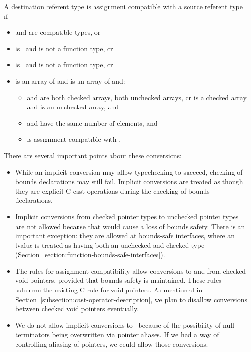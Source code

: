 A destination referent type  is assignment compatible with a source referent
type  if
\begin{itemize}
\item {} and  are compatible types, or
\item {} is \void\ and  is not a function type, or
\item {} is \void\ and  is not a function type, or
\item {} is an array of  and  is an array of 
and:
\begin{itemize}
\item {} and  are both checked arrays, both unchecked arrays, or
 is a checked array and  is an unchecked array, and
\item {} and  have the same number of elements, and
\item {} is assignment compatible with .
\end{itemize}
\end{itemize}

There are several important points about these conversions:
\begin{itemize}
\item  While an implicit conversion may allow typechecking to succeed,
       checking of bounds declarations may still fail.  Implicit
       conversions are treated as though they are explicit C cast
       operations during the checking of bounds declarations.
\item  Implicit conversions from checked pointer types to
      unchecked pointer types are not allowed because that would cause a loss of bounds safety.
      There is an important exception: they are allowed at bounds-safe interfaces,
      where an lvalue is treated as having both an unchecked
      and checked type (Section~\ref{section:function-bounds-safe-interfaces}).
\item The rules for assignment compatibility allow conversions to and from checked void pointers,
      provided that bounds safety is maintained.  These rules subsume the existing C rule for
      void pointers.  As mentioned in Section~\ref{subsection:cast-operator-description}, we plan
      to disallow conversions between checked void pointers eventually.
\item We do not allow implicit conversions to \ntarrayptrT\ because of the possibility
      of null terminators being overwritten via pointer aliases.  If we had a way of controlling
      aliasing of pointers, we could allow those conversions.
\end{itemize}

